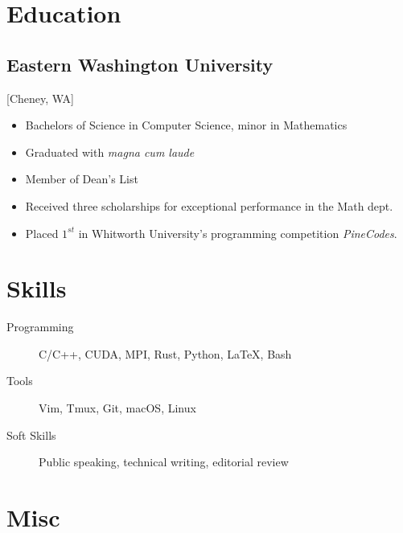 \documentclass{mycv}
\begin{document}
\section{Education}

\subsection{Eastern Washington University}[Cheney, WA]
\vspace{-\parskip}%
\begin{itemize}[label={}]
  \item Bachelors of Science in Computer Science, minor in Mathematics 
  \item Graduated with \textit{magna cum laude}
  \item Member of Dean's List
  \item Received three scholarships for exceptional performance in the Math dept.
  \item Placed $1^{st}$ in Whitworth University's programming competition \textit{PineCodes}. 
\end{itemize}

\section{Skills}

\begin{description}
  \item[Programming] C/C++, CUDA, MPI, Rust, Python, \LaTeX, Bash
  \item[Tools] Vim, Tmux, Git, macOS, Linux
  \item[Soft Skills] Public speaking, technical writing, editorial review
\end{description}

\section{Misc}
\end{document}
